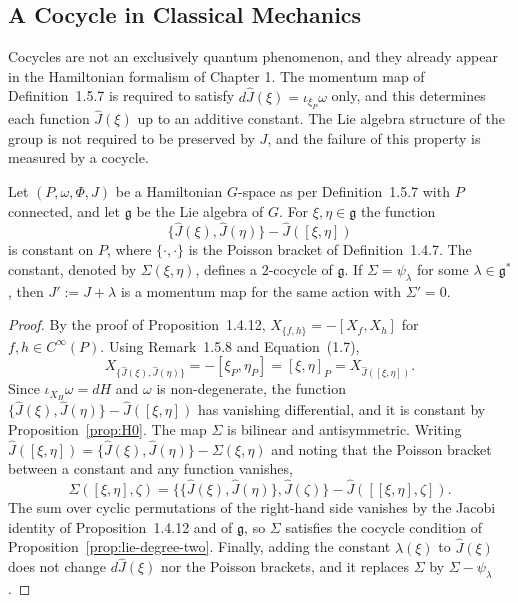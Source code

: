 \subsection{A Cocycle in Classical Mechanics}\label{subsec:classical-cocycle}

Cocycles are not an exclusively quantum phenomenon, and they already appear in the Hamiltonian formalism of Chapter 1. The momentum map of Definition~1.5.7 is required to satisfy $d\hat J(\xi)=\iota_{\xi_P}\omega$ only, and this determines each function $\hat J(\xi)$ up to an additive constant. The Lie algebra structure of the group is not required to be preserved by $J$, and the failure of this property is measured by a cocycle.

\begin{proposition}\label{prop:momentum-defect}
	Let $(P,\omega,\Phi,J)$ be a Hamiltonian $G$-space as per Definition~1.5.7 with $P$ connected, and let $\mathfrak{g}$ be the Lie algebra of $G$. For $\xi,\eta\in\mathfrak{g}$ the function
	\begin{equation*}
		\{\hat J(\xi),\hat J(\eta)\}-\hat J([\xi,\eta])
	\end{equation*}
	is constant on $P$, where $\{\cdot,\cdot\}$ is the Poisson bracket of Definition~1.4.7. The constant, denoted by $\Sigma(\xi,\eta)$, defines a $2$-cocycle of $\mathfrak{g}$. If $\Sigma=\psi_\lambda$ for some $\lambda\in\mathfrak{g}^*$, then $J':=J+\lambda$ is a momentum map for the same action with $\Sigma'=0$.
\end{proposition}

\begin{proof}
	By the proof of Proposition~1.4.12, $X_{\{f,h\}}=-[X_f,X_h]$ for $f,h\in C^\infty(P)$. Using Remark~1.5.8 and Equation~(1.7),
	\begin{equation*}
		X_{\{\hat J(\xi),\hat J(\eta)\}}=-[\xi_P,\eta_P]=[\xi,\eta]_P=X_{\hat J([\xi,\eta])}.
	\end{equation*}
	Since $\iota_{X_H}\omega=dH$ and $\omega$ is non-degenerate, the function $\{\hat J(\xi),\hat J(\eta)\}-\hat J([\xi,\eta])$ has vanishing differential, and it is constant by Proposition~\ref{prop:H0}. The map $\Sigma$ is bilinear and antisymmetric. Writing $\hat J([\xi,\eta])=\{\hat J(\xi),\hat J(\eta)\}-\Sigma(\xi,\eta)$ and noting that the Poisson bracket between a constant and any function vanishes,
	\begin{equation*}
		\Sigma([\xi,\eta],\zeta)=\{\{\hat J(\xi),\hat J(\eta)\},\hat J(\zeta)\}-\hat J([[\xi,\eta],\zeta]).
	\end{equation*}
	The sum over cyclic permutations of the right-hand side vanishes by the Jacobi identity of Proposition~1.4.12 and of $\mathfrak{g}$, so $\Sigma$ satisfies the cocycle condition of Proposition~\ref{prop:lie-degree-two}. Finally, adding the constant $\lambda(\xi)$ to $\hat J(\xi)$ does not change $d\hat J(\xi)$ nor the Poisson brackets, and it replaces $\Sigma$ by $\Sigma-\psi_\lambda$.
\end{proof}

